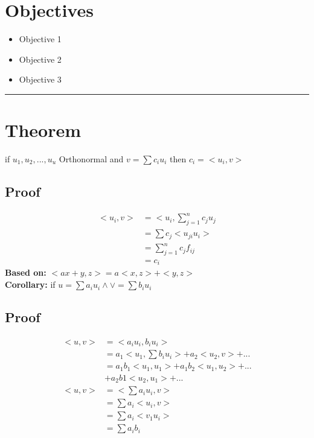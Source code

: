 

\section*{Objectives}
\begin{itemize}
    \item Objective 1
    \item Objective 2
    \item Objective 3
\end{itemize}

\rule[0.0051in]{\textwidth}{0.00025in}


\section{Theorem}
if ${u_1,u_2,...,u_u}$ Orthonormal and $v=\sum c_iu_i$ then $c_i=<u_i,v>$\\
\subsection{Proof}
\begin{align*}
<u_i,v> &=<u_i,\sum_{j=1}^{n}c_ju_j\\
&=\sum c_j <u_{ji}u_i>\\
&=\sum_{j=1}^{n} c_jf_{ij}\\
&= c_i
\end{align*}
\textbf{Based on:} $<ax+y,z>=a<x,z>+<y,z>$ \\
\textbf{Corollary:} if $u=\sum a_iu_i \land \lor =\sum b_iu_i$
\subsection{Proof}
\begin{align*}
<u,v> &=<a_iu_i,b_iu_i>\\
&=a_1<u_1,\sum b_iu_i>+a_2<u_2,v>+...\\
&=a_1b_1<u_1,u_1>+a_1b_2<u_1,u_2>+...\\
&+a_2b1<u_2,u_1>+...\\
<u,v> &=<\sum a_i u_i,v>\\
&=\sum a_i<u_i,v>\\
&=\sum a_i <v_1u_i>\\
&=\sum a_i b_i\\
\end{align*}

